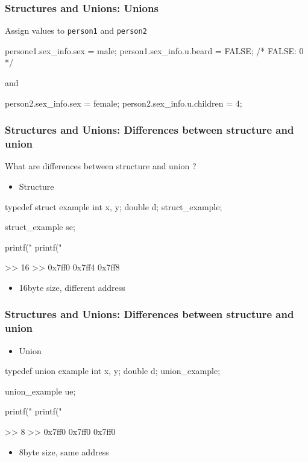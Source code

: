 \documentclass[newPxFont,sthlmFooter,nooffset]{beamer}
\begin{document}
\begin{frame}[t, fragile]
  \frametitle{Structures and Unions: Unions}
Assign values to \texttt{person1} and \texttt{person2}
\begin{codedef}
persone1.sex_info.sex = male; 
person1.sex_info.u.beard = FALSE; /* FALSE: 0 */
\end{codedef}

and

\begin{codedef}
person2.sex_info.sex = female; 
person2.sex_info.u.children = 4;
\end{codedef}
\end{frame}
\begin{frame}[t, fragile]
	\frametitle{Structures and Unions: {\large Differences between structure and union}}
What are differences between structure and union ? 
\begin{itemize}
	\item Structure
\end{itemize}
\begin{codedef}
typedef struct example{
	int x, y;
	double d;
}struct_example;

struct_example se;

printf("%
printf("%
\end{codedef}

>> 16
\newline>> 0x7ff0 0x7ff4 0x7ff8
\begin{itemize}
	\item 16byte size, different address
\end{itemize}
\end{frame}

\begin{frame}[t, fragile]
	\frametitle{Structures and Unions: {\large Differences between structure and union}}
\begin{itemize}
	\item Union
\end{itemize}
\begin{codedef}
	typedef union example{
		int x, y;
		double d;
	}union_example;

	union_example ue;
	
	printf("%
	printf("%
\end{codedef}

>> 8
\newline>> 0x7ff0 0x7ff0 0x7ff0 
\begin{itemize}
	\item 8byte size, same address
\end{itemize}
\end{frame}
\end{document}
